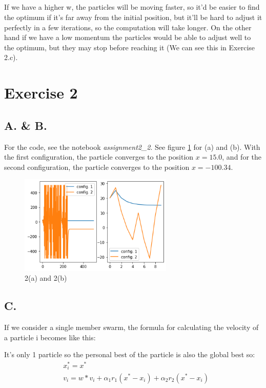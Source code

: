 \documentclass{scrartcl}
\begin{document}
\subsection{}
If we have a higher w, the particles will be moving faster, so it'd be easier to find the optimum if it's far away from the initial position, but it'll be hard to adjust it perfectly in a few iterations, so the computation will take longer.
On the other hand if we have a low momentum the particles would be able to adjust well to the optimum, but they may stop before reaching it (We can see this in Exercise 2.c).

\section{Exercise 2}
\subsection*{A. \& B.}
For the code, see the notebook \emph{assignment2\_2}.
See figure \ref{fig:2_1} for (a) and (b). With the first configuration,
the particle converges to the position $x = 15.0$, and for the second
configuration, the particle converges to the position $x = -100.34$.

\begin{figure}
  \centering
  \includegraphics[width=0.65\textwidth]{images/2.png}
  \caption{2(a) and 2(b)}
  \label{fig:2_1}
\end{figure}

\subsection*{C.}
If we consider a single member swarm, the formula for calculating the
velocity of a particle i becomes like this:

It's only 1 particle so the personal best of the particle is also the
global best so:
\begin{align}
  & x_{i}^{*} = x^* \\
  & v_i = w*v_i + \alpha _1 r_1 (x^{*} - x_i) + \alpha _2 r_2 (x^{*} - x_i)
\end{align}
\end{document}
